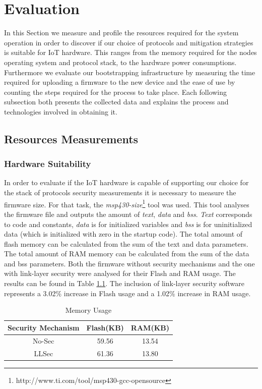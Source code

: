 
\chapter{Evaluation}
\label{chapter:evaluation}

In this Section we measure and profile the resources required for the system operation in order to discover if our choice of protocols and mitigation strategies is suitable for \gls{IoT} hardware. 
This ranges from the memory required for the nodes operating system and protocol stack, to the hardware power consumptions. 
Furthermore we evaluate our bootstrapping infrastructure by measuring the time required for uploading a firmware to the new device and the ease of use by counting the steps required for the process to take place. 
Each following subsection both presents the collected data and explains the process and technologies involved in obtaining it.

\section{Resources Measurements}

\subsection{Hardware Suitability}
In order to evaluate if the \gls{IoT} hardware is capable of supporting our choice for the stack of protocols security measurements it is necessary to measure the firmware size. 
For that task, the \textit{msp430-size}\footnote{http://www.ti.com/tool/msp430-gcc-opensource} tool was used. 
This tool analyses the firmware file and outputs the amount of \textit{text}, \textit{data} and \textit{bss}.
\textit{Text} corresponds to code and constants, \textit{data} is for initialized variables and \textit{bss} is for uninitialized data (which is initialized with zero in the startup code).
The total amount of flash memory can be calculated from the sum of the text and data parameters.
The total amount of \gls{RAM} memory can be calculated from the sum of the data and bss parameters.
Both the firmware without security mechanisms and the one with link-layer security were analysed for their Flash and RAM usage. 
The results can be found in Table \ref{tab:space_req}. The inclusion of link-layer security software represents a 3.02\% increase in Flash usage and a 1.02\% increase in RAM usage.

\begin{table}
\centering
\caption{Memory Usage}
\label{tab:space_req}
\begin{tabular}{|c|c|c|} \hline
Security Mechanism&Flash(KB)&RAM(KB)\\ \hline
No-Sec& 59.56& 13.54\\ \hline
LLSec& 61.36& 13.80\\ %
\hline\end{tabular}
\end{table}

